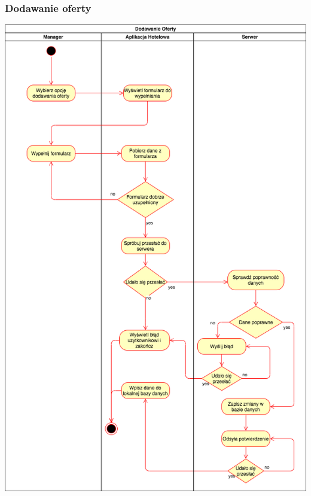 \documentclass{article}
\begin{document}
\subsubsection{Dodawanie oferty}
\begin{center}
    \includegraphics[scale=0.4]{Aktywnosc/IO_Aktywności-Dodawanie oferty.png}\newpage

\end{center}
\end{document}
